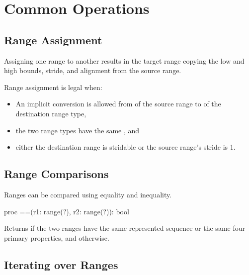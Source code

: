 \section{Common Operations}

\subsection{Range Assignment}
\label{Range_Assignment}

Assigning one range to another results in the target range
copying the low and high bounds, stride, and alignment
from the source range.

Range assignment is legal when:
\begin{itemize}
\item An implicit conversion is allowed from  of the source range
       to  of the destination range type,
\item the two range types have the same , and
\item either the destination range is stridable or the source range's
      stride is 1.
\end{itemize}

\subsection{Range Comparisons}

Ranges can be compared using equality and inequality.

\begin{protohead}
proc ==(r1: range(?), r2: range(?)): bool
\end{protohead}
\begin{protobody}
Returns  if the two ranges have the same represented sequence
or the same four primary properties,
and  otherwise.
\end{protobody}

\subsection{Iterating over Ranges}

